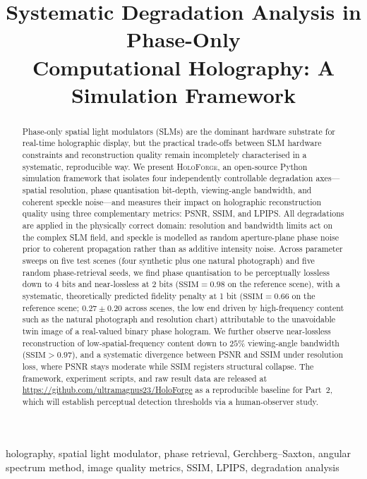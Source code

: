 \documentclass[conference]{IEEEtran}
\title{Systematic Degradation Analysis in Phase-Only\\Computational Holography: A Simulation Framework}
\author{
  \IEEEauthorblockN{[Author One]}
  \IEEEauthorblockA{[Institution]\\
  [City, Country]\\
  [author.one@institution.edu]}
  \and
  \IEEEauthorblockN{[Author Two]}
  \IEEEauthorblockA{[Institution]\\
  [City, Country]\\
  [author.two@institution.edu]}
  \and
  \IEEEauthorblockN{[Author Three]}
  \IEEEauthorblockA{[Institution]\\
  [City, Country]\\
  [author.three@institution.edu]}
}
\begin{document}
\maketitle

\begin{abstract}
Phase-only spatial light modulators (SLMs) are the dominant hardware substrate
for real-time holographic display, but the practical trade-offs between SLM
hardware constraints and reconstruction quality remain incompletely characterised
in a systematic, reproducible way. We present \textsc{HoloForge}, an open-source
Python simulation framework that isolates four independently controllable
degradation axes---spatial resolution, phase quantisation bit-depth,
viewing-angle bandwidth, and coherent speckle noise---and measures their impact
on holographic reconstruction quality using three complementary metrics: PSNR,
SSIM, and LPIPS. All degradations are applied in the physically correct domain:
resolution and bandwidth limits act on the complex SLM field, and speckle is
modelled as random aperture-plane phase noise prior to coherent propagation
rather than as additive intensity noise. Across parameter sweeps on five
test scenes (four synthetic plus one natural photograph) and five random
phase-retrieval seeds, we find phase quantisation to be perceptually lossless
down to 4 bits and near-lossless at 2 bits ($\text{SSIM} = 0.98$ on the
reference scene), with a systematic, theoretically predicted fidelity penalty at
1 bit ($\text{SSIM} = 0.66$ on the reference scene; $0.27 \pm 0.20$ across
scenes, the low end driven by high-frequency content such as the natural
photograph and resolution chart) attributable to the unavoidable twin image of a
real-valued binary phase hologram. We further observe
near-lossless reconstruction of low-spatial-frequency content down to $25\%$
viewing-angle bandwidth ($\text{SSIM} > 0.97$), and a systematic divergence
between PSNR and SSIM under resolution loss, where PSNR stays moderate while
SSIM registers structural collapse. The framework, experiment scripts, and raw result
data are released at \url{https://github.com/ultramagnus23/HoloForge} as a
reproducible baseline for Part~2, which will establish perceptual detection
thresholds via a human-observer study.
\end{abstract}

\begin{IEEEkeywords}
holography, spatial light modulator, phase retrieval, Gerchberg--Saxton,
angular spectrum method, image quality metrics, SSIM, LPIPS, degradation analysis
\end{IEEEkeywords}
\end{document}
